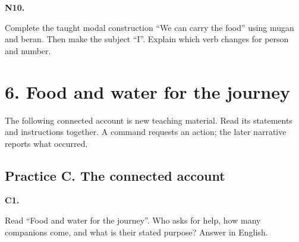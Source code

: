 \par\begin{minipage}{\linewidth}\raggedright
\textbf{N10.}

Complete the taught modal construction “We can carry the food” using mugan and beran. Then make the subject “I”. Explain which verb changes for person and number.

\end{minipage}\par\addvspace{4pt}

\section*{6. Food and water for the journey}

The following connected account is new teaching material. Read its statements and instructions together. A command requests an action; the later narrative reports what occurred.

\par\begin{minipage}{\linewidth}\raggedright
{}
\end{minipage}\par

\subsection*{Practice C. The connected account}

\par\begin{minipage}{\linewidth}\raggedright
\textbf{C1.}

Read “Food and water for the journey”. Who asks for help, how many companions come, and what is their stated purpose? Answer in English.

\end{minipage}\par\addvspace{4pt}

